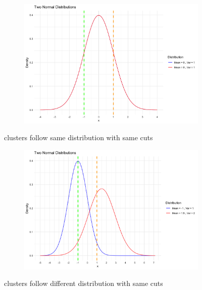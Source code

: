 \documentclass{article}
\begin{document}
\begin{figure}[h]
  \centering
  \begin{subfigure}{0.8\textwidth}
      \centering
      \includegraphics[width=\textwidth]{images/dist_simu/4-0_1.png}
  \end{subfigure}
  \caption{clusters follow same distribution with same cuts}
  \label{fig:same_dist}
\end{figure}


\begin{figure}[h]
  \centering
  \begin{subfigure}{0.8\textwidth}
      \centering
      \includegraphics[width=\textwidth]{images/dist_simu/3--1_1_15_2.png}
  \end{subfigure}
  \caption{clusters follow different distribution with same cuts}
  \label{fig:diff_dist}
\end{figure}
\end{document}
